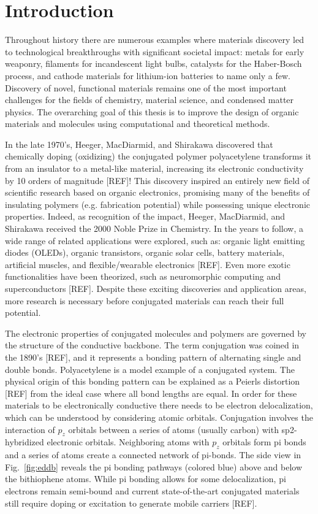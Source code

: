 \chapter{Introduction}

Throughout history there are numerous examples where materials discovery led to technological breakthroughs with significant societal impact: metals for early weaponry, filaments for incandescent light bulbs, catalysts for the Haber-Bosch process, and cathode materials for lithium-ion batteries to name only a few. Discovery of novel, functional materials remains one of the most important challenges for the fields of chemistry, material science, and condensed matter physics. The overarching goal of this thesis is to improve the design of organic materials and molecules using computational and theoretical methods.

In the late 1970’s, Heeger, MacDiarmid, and Shirakawa discovered that chemically doping (oxidizing) the conjugated polymer polyacetylene transforms it from an insulator to a metal-like material, increasing its electronic conductivity by 10 orders of magnitude [REF]! This discovery inspired an entirely new field of scientific research based on organic electronics, promising many of the benefits of insulating polymers (e.g. fabrication potential) while possessing unique electronic properties. Indeed, as recognition of the impact, Heeger, MacDiarmid, and Shirakawa received the 2000 Noble Prize in Chemistry. In the years to follow, a wide range of related applications were explored, such as: organic light emitting diodes (OLEDs), organic transistors, organic solar cells, battery materials, artificial muscles, and flexible/wearable electronics [REF]. Even more exotic functionalities have been theorized, such as neuromorphic computing and superconductors [REF]. Despite these exciting discoveries and application areas, more research is necessary before conjugated materials can reach their full potential.

The electronic properties of conjugated molecules and polymers are governed by the structure of the conductive backbone. The term conjugation was coined in the 1890’s [REF], and it represents a bonding pattern of alternating single and double bonds. Polyacetylene is a model example of a conjugated system. The physical origin of this bonding pattern can be explained as a Peierls distortion [REF] from the ideal case where all bond lengths are equal. In order for these materials to be electronically conductive there needs to be electron delocalization, which can be understood by considering atomic orbitals. Conjugation involves the interaction of $p_z$ orbitals between a series of atoms (usually carbon) with sp2-hybridized electronic orbitals. Neighboring atoms with $p_z$ orbitals form pi bonds and a series of atoms create a connected network of pi-bonds. The side view in Fig.~\ref{fig:eddb} reveals the pi bonding pathways (colored blue) above and below the bithiophene atoms. While pi bonding allows for some delocalization, pi electrons remain semi-bound and current state-of-the-art conjugated materials still require doping or excitation to generate mobile carriers [REF].

